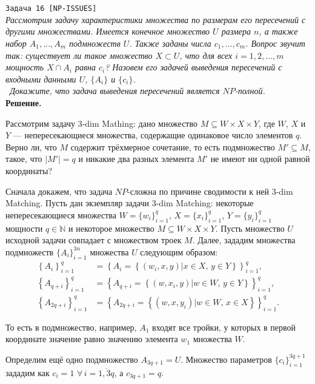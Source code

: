 \documentclass[10pt]{article}
\begin{document}
\ \\[0.5 cm]
\hline
\ \\[0.5 cm]
{\large\texttt{Задача 16 [NP-ISSUES]}}
\ \\[0.1cm]
\textit{Рассмотрим задачу характеристики множества по размерам его пересечений
с другими множествами. Имеется конечное множество $U$ размера $n$, а также
набор $A_1, \dots, A_m$ подмножеств $U$. Также заданы числа $c_1, \dots, c_m$. Вопрос звучит так: существует ли такое множество $X\subset U$, что для всех $i = 1, 2, \dots, m$ мощность $X \cap A_i$ равна $c_i$? Назовем его задачей выведения пересечений с входными данными $U$, $\{A_i\}$ и $\{c_i\}$.
\\ \
Докажите, что задача выведения пересечений является $NP$-полной.
}
\ \\[0.3cm]
\textbf{Решение.} 
\medskip\par 
Рассмотрим задачу 3-dim Mathing: дано множество  $M \subseteq W\times X\times Y$, где $W$, $X$ и $Y$ --- непересекающиеся множества, содержащие одинаковое число элементов $q$. Верно ли, что $M$ содержит трёхмерное сочетание, то есть подмножество $M'\subseteq M$, такое, что $|M'|=q$ и никакие два разных элемента $M'$ не имеют ни одной равной координаты?
\medskip\par
Сначала докажем, что задача $NP$-сложна по причине сводимости к ней 3-dim Matching. Пусть дан экземпляр задачи 3-dim Matching: некоторые непересекающиеся множества $W=\{w_i\}_{i=1}^q$, $X=\{x_i\}_{i=1}^q$, $Y=\{y_i\}_{i=1}^q$ мощности $q\in\mathbb{N}$ и некоторое множество $M\subseteq W\times X\times Y$. Пусть множество $U$ исходной задачи совпадает с множеством троек $M$. Далее, зададим множества подмножеств $\{A_i\}_{i=1}^{3n}$ множества $U$ следующим образом: 
\begin{align*}
\left\{A_{i}\right\}_{i=1}^q &=  \left\{A_i=\left\{(w_i, x, y)|x\in X,\, y\in Y\right\}\right\}_{i=1}^q,\\
\left\{A_{q+i}\right\}_{i=1}^q &= \left\{A_{q+i}=\left\{(w, x_i, y)|w\in W,\, y\in Y\right\}\right\}_{i=1}^q,\\
\left\{A_{2q+i}\right\}_{i=1}^q &= \left\{A_{2q+i}=\left\{(w, x, y_i)|w\in W,\, x\in X\right\}\right\}_{i=1}^q.
\end{align*}
\par То есть в подмножество, например, $A_1$ входят все тройки, у которых в первой координате значение равно значению элемента $w_1$ множества $W$. 
\medskip\par
Определим ещё одно подмножество $A_{3q+1}=U$. Множество параметров $\{c_i\}_{i=1}^{3q+1}$ зададим как $c_i=1$ $\forall\,i=\overline{1, 3q}$, а $c_{3q+1}=q$.
\end{document}
